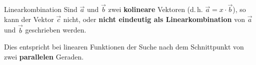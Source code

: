 \begin{bemerkung}{Linearkombination}{}
  Sind $\vec{a}$ und $\vec{b}$ zwei \textbf{kolineare} Vektoren
  (d.\,h. $\vec{a} = x\cdot{}\vec{b}$), so kann der Vektor $\vec{c}$
  nicht, oder \textbf{nicht eindeutig als Linearkombination} von $\vec{a}$ und
  $\vec{b}$ geschrieben werden.

  Dies entspricht bei linearen Funktionen der Suche nach dem
  Schnittpunkt von zwei \textbf{parallelen} Geraden.
  \end{bemerkung}

\newpage
